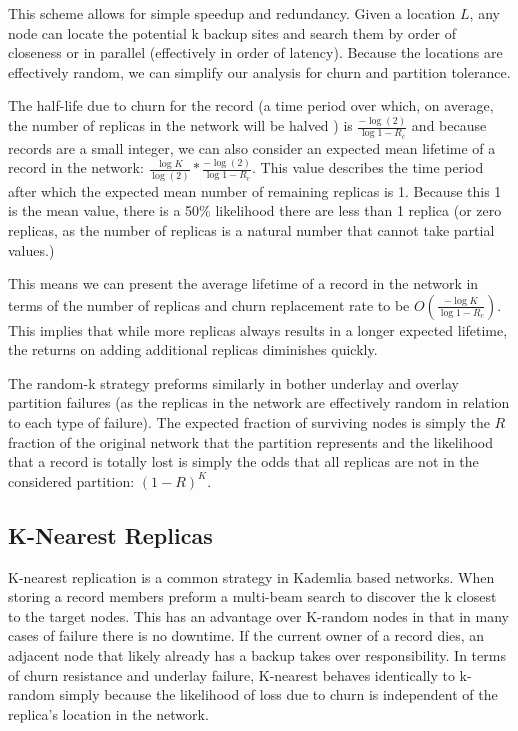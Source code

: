 This scheme allows for simple speedup and redundancy.
Given a location $L$, any node can locate the potential k backup sites and search them by order of closeness or in parallel (effectively in order of latency).
Because the locations are effectively random, we can simplify our analysis for churn and partition tolerance.

The half-life due to churn for the record (a time period over which, on average, the number of replicas in the network will be halved ) is $\frac{-\log(2)}{\log{1-R_{c}}}$ and because records are a small integer, we can also consider an expected mean lifetime of a record in the network: $\frac{\log{K}}{\log(2)} * \frac{-\log(2)}{\log{1-R_{c}}}$. This value describes the time period after which the expected mean number of remaining replicas is 1. Because this 1 is the mean value, there is a 50\% likelihood there are less than 1 replica (or zero replicas, as the number of replicas is a natural number that cannot take partial values.)

This means we can present the average lifetime of a record in the network in terms of the number of replicas and churn replacement rate to be $O(\frac{-\log{K}}{\log{1-R_{c}}})$.
This implies that while more replicas always results in a longer expected lifetime, the returns on adding additional replicas diminishes quickly.

The random-k strategy preforms similarly in bother underlay and overlay partition failures (as the replicas in the network are effectively random in relation to each type of failure).
The expected fraction of surviving nodes is simply the $R$ fraction of the original network that the partition represents and the likelihood that a record is totally lost is simply the odds that all replicas are not in the considered partition: $(1-R)^{K}$. 


\subsection{K-Nearest Replicas}
K-nearest replication is a common strategy in Kademlia based networks.
When storing a record members preform a multi-beam search to discover the k closest to the target nodes.
This has an advantage over K-random nodes in that in many cases of failure there is no downtime.
If the current owner of a record dies, an adjacent node that likely already has a backup takes over responsibility.
In terms of churn resistance and underlay failure, K-nearest behaves identically to k-random simply because the likelihood of loss due to churn is independent of the replica's location in the network.

